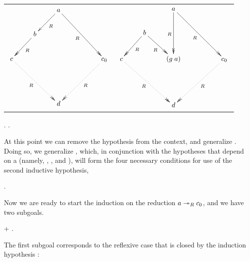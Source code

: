         \begin{tabular}{c@{\hskip 0.5cm}c} $\xymatrix{ & & a
        \ar@{->>}[ddrr]_R \ar@{->}[dl]^R & & \\ & b \ar@{->>}[dl]^R &
        & & \\ c \ar@{.>>}[ddrr]_R & & & & c_0 \ar@{.>>}[ddll]^R \\ &
        & & & \\ & & d & & }$ & $\xymatrix{ & & a \ar@{->>}[ddrr]_R
        \ar@{->>}[dd]_R & & \\ & b \ar@{->>}[dl]^R \ar@{->>}[dr]_R & &
        & \\ c \ar@{.>>}[ddrr]_R & & (g \; a) & & c_0
        \ar@{.>>}[ddll]^R \\ & & & & \\ & & d & & }$ \end{tabular} \begin{coqdoccode}
\coqdocnoindent
\coqdoceol
\coqdocindent{2.00em}
 .   . \end{coqdoccode}
At this point we can remove
      the hypothesis  from the context, and generalize . Doing so, 
      we generalize , which, in conjunction with the hypotheses 
      that depend on a (namely, , , and ), will form 
      the four necessary conditions for use of the second inductive 
      hypothesis, \begin{coqdoccode}
\coqdocemptyline
\coqdocindent{2.00em}
 . \end{coqdoccode}
Now we are ready to start the induction on
    the reduction $a\twoheadrightarrow_R c_0$, and we have two subgoals. \begin{coqdoccode}
\coqdocemptyline
\coqdocindent{2.00em}
+     . \end{coqdoccode}
The first subgoal corresponds
        to the reflexive case that is closed by the induction
        hypothesis :


